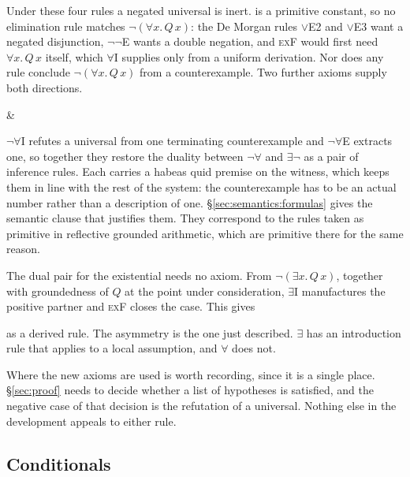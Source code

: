 Under these four rules a negated universal is inert.   is a
primitive constant, so no elimination rule matches $\neg(\forall x.\,Q\,x)$: the
De Morgan rules $\vee$E2 and $\vee$E3 want a negated disjunction, $\neg\neg$E
wants a double negation, and \textsc{exF} would first need $\forall x.\,Q\,x$
itself, which $\forall$I supplies only from a uniform derivation.  Nor does any
rule conclude $\neg(\forall x.\,Q\,x)$ from a counterexample.  Two further
axioms supply both directions.

\begin{rules}
 &
\end{rules}


\noindent
$\neg\forall$I refutes a universal from one terminating counterexample and
$\neg\forall$E extracts one, so together they restore the duality between
$\neg\forall$ and $\exists\neg$ as a pair of inference rules.  Each carries a
habeas quid premise on the witness, which keeps them in line with the rest of the
system: the counterexample has to be an actual number rather than a description
of one.  \S\ref{sec:semantics:formulas} gives the semantic clause that justifies
them.  They correspond to the rules taken as primitive in reflective grounded
arithmetic, which are primitive there for the same reason.

The dual pair for the existential needs no axiom.  From $\neg(\exists
x.\,Q\,x)$, together with groundedness of $Q$ at the point under consideration,
$\exists$I manufactures the positive partner and \textsc{exF} closes the case.
This gives
\begin{center}
\end{center}
as a derived rule.  The asymmetry is the one just described.  $\exists$ has an
introduction rule that applies to a local assumption, and $\forall$ does not.

Where the new axioms are used is worth recording, since it is a single place.
\S\ref{sec:proof} needs to decide whether a list of hypotheses is satisfied, and
the negative case of that decision is the refutation of a universal.  Nothing
else in the development appeals to either rule.

\subsection{Conditionals}


